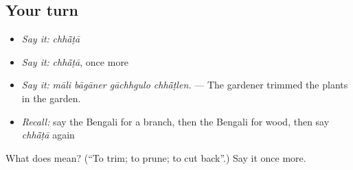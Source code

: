 \subsection*{Your turn}
\begin{itemize}
\raggedright
  \item \emph{Say it:} \emph{chhā̃ṭā}
  \item \emph{Say it:} \emph{chhā̃ṭā}, once more
  \item \emph{Say it:} \emph{māli bāgāner gāchhgulo chhā̃ṭlen.} — The gardener trimmed the plants in the garden.
  \item \emph{Recall:} say the Bengali for a branch, then the Bengali for wood, then say \emph{chhā̃ṭā} again
\end{itemize}

\begin{tcolorbox}[breakable,colback=teal!4,colframe=teal!35!black,title={Before you move on}]
What does  mean? (\textquotedblleft{}To trim; to prune; to cut back\textquotedblright{}.) Say it once more.
\end{tcolorbox}

